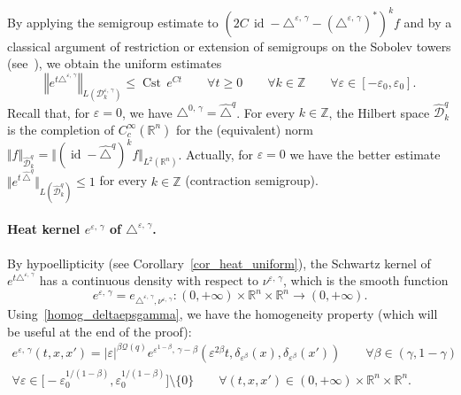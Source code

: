 \documentclass[10pt]{amsart}
\theoremstyle{definition}\newtheorem{defi}[theo]{Definition}\newtheorem{rema}[theo]{Remark}\newtheorem{exam}[theo]{Example}\newtheorem{exem}[theo]{Example}\newtheorem{nota}[theo]{Notation}
\newcommand*\R{\mathbb{R}}
\newcommand*\Z{\mathbb{Z}}
\newcommand{\calQ}{\mathcal{Q}}
\newcommand{\calD}{\mathcal{D}}
\DeclareMathOperator{\Cst}{Cst}
\DeclareMathOperator{\id}{id}
\renewcommand{\geq}{\geqslant}
\renewcommand{\leq}{\leqslant}
\let\oldforall\forall
\renewcommand*{\forall}{\mathrel{\oldforall}}
\begin{document}
By applying the semigroup estimate to $(2C\,\id-\triangle^{\varepsilon,\,\gamma}-(\triangle^{\varepsilon,\,\gamma})^*)^k f$ and by a classical argument of restriction or extension of semigroups on the Sobolev towers (see~\cite{EngelNagel}), we obtain the uniform estimates
\begin{equation}\label{ineg_contraction_epsgamma}
\left\Vert e^{t\triangle^{\varepsilon,\,\gamma}}\right\Vert_{L\left(\calD^{\varepsilon,\,\gamma}_k\right)}\leq \Cst\, e^{Ct}\qquad \forall t\geq 0\qquad \forall k\in\Z \qquad\forall\varepsilon\in[-\varepsilon_0,\varepsilon_0].
\end{equation}
Recall that, for $\varepsilon=0$, we have $\triangle^{0,\,\gamma}=\widehat{\triangle}^{q}$. For every $k\in\Z$, the Hilbert space $\widehat{\calD}^{q}_k$ is the completion of $C_c^\infty(\R^n)$ for the (equivalent) norm $\Vert f\Vert_{\widehat{\calD}^{q}_k} = \Vert (\id-\widehat{\triangle}^{q})^kf\Vert_{L^2(\R^n)}$. Actually, for $\varepsilon=0$ we have the better estimate $\Vert e^{t \,\widehat{\triangle}^{q}}\Vert_{L(\widehat{\calD}^{q}_k)}\leq 1$ for every $k\in\Z$ (contraction semigroup).



\paragraph{Heat kernel $e^{\varepsilon,\,\gamma}$ of $\triangle^{\varepsilon,\,\gamma}$.}
By hypoellipticity (see Corollary~\ref{cor_heat_uniform}), the Schwartz kernel of $e^{t\triangle^{\varepsilon,\,\gamma}}$ has a continuous density with respect to $\nu^{\varepsilon,\,\gamma}$, which is the smooth function
\[
e^{\varepsilon,\,\gamma} = e_{\triangle^{\varepsilon,\,\gamma},\nu^{\varepsilon,\,\gamma}}: (0,+\infty)\times \R^n\times\R^n\rightarrow(0,+\infty).
\]
Using~\eqref{homog_deltaepsgamma}, we have the homogeneity property (which will be useful at the end of the proof):
\begin{multline}\label{homog_eepsgamma}
e^{\varepsilon,\,\gamma}(t,x,x') = \vert\varepsilon\vert^{\beta\calQ(q)} e^{\varepsilon^{1-\beta},\,\gamma-\beta} \left(\varepsilon^{2\beta} t, \delta_{\varepsilon^\beta}(x), \delta_{\varepsilon^\beta}(x')\right)
\qquad \forall\beta\in(\gamma,1-\gamma)\\
\forall \varepsilon\in \big[-\varepsilon_0^{1/(1-\beta)},\varepsilon_0^{1/(1-\beta)} \big] \setminus\{0\}\qquad \forall (t,x,x')\in (0,+\infty)\times\R^n\times\R^n.
\end{multline}
\end{document}
